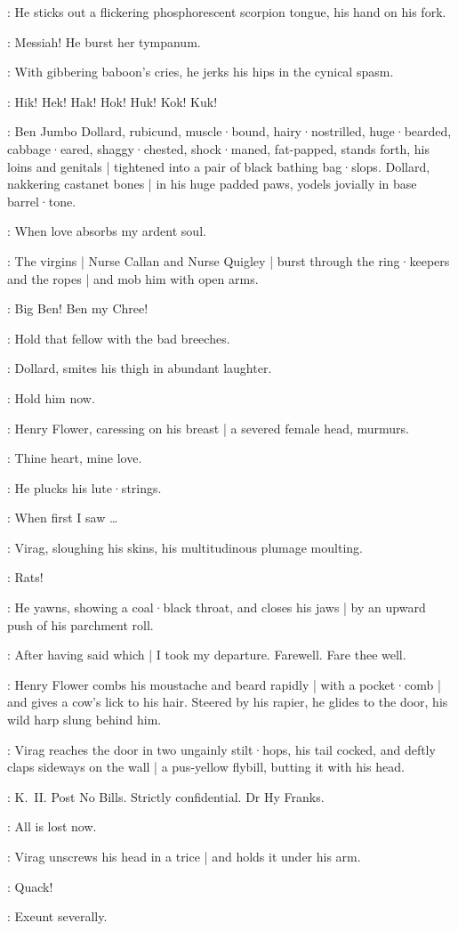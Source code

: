 :
He sticks out a flickering phosphorescent scorpion tongue,
his hand on his fork.

\Virag:
Messiah!
He burst her tympanum.

:
With gibbering baboon's cries,
he jerks his hips in the cynical spasm.

\Virag:
Hik!
Hek!
Hak!
Hok!
Huk!
Kok!
Kuk!

:
Ben Jumbo Dollard,
rubicund,
muscle·bound,
hairy·nostrilled,
huge·bearded,
cabbage·eared,
shaggy·chested,
shock·maned,
fat-papped,
stands forth,
his loins and genitals |
tightened into a pair of black bathing bag·slops.
Dollard,
nakkering castanet bones |
in his huge padded paws,
yodels jovially in base barrel·tone.

\BenDollard:
When love absorbs my ardent soul.

:
The virgins |
Nurse Callan and Nurse Quigley |
burst through the ring·keepers and the ropes |
and mob him with open arms.

\Virgins:
Big Ben!
Ben my Chree!

\Voice:
Hold that fellow with the bad breeches.

:
Dollard,
smites his thigh in abundant laughter.

\BenDollard:
Hold him now.

:
Henry Flower,
caressing on his breast |
a severed female head,
murmurs.

\Henry:
Thine heart,
mine love.

:
He plucks his lute·strings.

\Henry:
When first I saw \ldots

:
Virag,
sloughing his skins,
his multitudinous plumage moulting.

\Virag:
Rats!

:
He yawns,
showing a coal·black throat,
and closes his jaws |
by an upward push of his parchment roll.

\Virag:
After having said which |
I took my departure.
Farewell.
Fare thee well.

:
Henry Flower combs his moustache and beard rapidly |
with a pocket·comb |
and gives a cow's lick to his hair.
Steered by his rapier,
he glides to the door,
his wild harp slung behind him.

:
Virag reaches the door in two ungainly stilt·hops,
his tail cocked,
and deftly claps sideways on the wall |
a pus-yellow flybill,
butting it with his head.

\Flybill[2]:
K.~II.
Post No Bills.
Strictly confidential.
Dr Hy Franks.

\Henry:
All is lost now.

:
Virag unscrews his head in a trice |
and holds it under his arm.

\ViragsHead:
Quack!

\All:
Exeunt severally.
